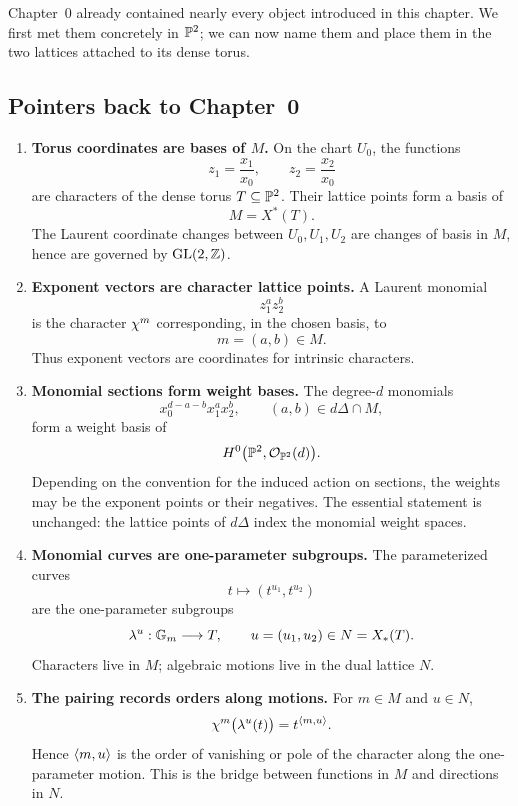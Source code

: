 Chapter~0 already contained nearly every object introduced in this
chapter. We first met them concretely in \(\mathbb{P}^2\); we can now name
them and place them in the two lattices attached to its dense torus.

\subsection*{Pointers back to Chapter~0}

\begin{enumerate}[label=\textbf{\arabic*.},wide=0pt]

\item \textbf{Torus coordinates are bases of \(M\).}
On the chart \(U_0\), the functions
\[
z_1=\frac{x_1}{x_0},
\qquad
z_2=\frac{x_2}{x_0}
\]
are characters of the dense torus \(T\subseteq\mathbb{P}^2\). Their lattice
points form a basis of
\[
M=X^*(T).
\]
The Laurent coordinate changes between \(U_0,U_1,U_2\) are changes of
basis in \(M\), hence are governed by
\(\operatorname{GL}(2,\mathbb{Z})\).

\item \textbf{Exponent vectors are character lattice points.}
A Laurent monomial
\[
z_1^az_2^b
\]
is the character \(\chi^{m}\) corresponding, in the chosen basis,
to
\[
m=(a,b)\in M.
\]
Thus exponent vectors are coordinates for intrinsic characters.

\item \textbf{Monomial sections form weight bases.}
The degree-\(d\) monomials
\[
x_0^{d-a-b}x_1^ax_2^b,
\qquad
(a,b)\in d\Delta\cap M,
\]
form a weight basis of
\[
H^0\bigl(\mathbb{P}^2,\mathcal{O}_{\mathbb{P}^2}(d)\bigr).
\]
Depending on the convention for the induced action on sections, the
weights may be the exponent points or their negatives. The essential
statement is unchanged: the lattice points of \(d\Delta\) index the
monomial weight spaces.

\item \textbf{Monomial curves are one-parameter subgroups.}
The parameterized curves
\[
t\longmapsto(t^{u_1},t^{u_2})
\]
are the one-parameter subgroups
\[
\lambda^{u}:\mathbb{G}_{m}\longrightarrow T,
\qquad
u=(u_1,u_2)\in N=X_*(T).
\]
Characters live in \(M\); algebraic motions live in the dual lattice
\(N\).

\item \textbf{The pairing records orders along motions.}
For \(m\in M\) and \(u\in N\),
\[
\chi^{m}\bigl(\lambda^{u}(t)\bigr)
=
t^{\left\langle m,u\right\rangle}.
\]
Hence \(\left\langle m,u\right\rangle\) is the order of vanishing or pole of the
character along the one-parameter motion. This is the bridge between
functions in \(M\) and directions in \(N\).


\end{enumerate}
